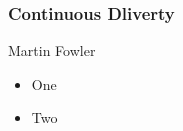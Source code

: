 \begin{frame}
\frametitle{Continuous Dliverty}
    Martin Fowler
    \begin{itemize}
        \item One
        \item Two
    \end{itemize}
\end{frame}

